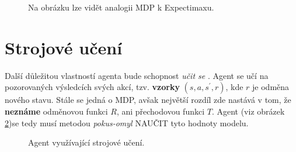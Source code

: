 \begin{figure}[!htbp]
\begin{center}
	\caption{Na obrázku lze vidět analogii MDP k Expectimaxu.}
	\label{img:mdptree}
\end{center}
\end{figure}
\newpage
\section{Strojové učení}
\label{sec:rl}
Další důležitou vlastností agenta bude schopnost \textit{učit se} \cite{RLIntro}. Agent se učí na pozorovaných výsledcích svých akcí, tzv. \textbf{vzorky} $(s,a,s^\prime,r)$, kde $r$ je odměna nového stavu. Stále se jedná o MDP, avšak největší rozdíl zde nastává v tom, že \textbf{neznáme} odměnovou funkci \boldmath$R$, ani přechodovou funkci \boldmath$T$. Agent (viz obrázek \ref{img:learningagent})se tedy musí metodou \textit{pokus-omyl} NAUČIT tyto hodnoty modelu.

\begin{figure}[!htbp]
\begin{center}
	\caption{Agent využívající strojové učení.}
	\label{img:learningagent}
\end{center}
\end{figure}


